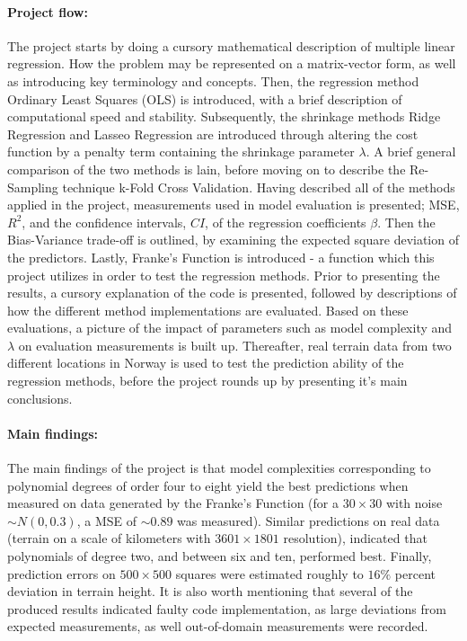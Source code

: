 \documentclass[%
oneside,                 %
final,                   %
10pt]{article}
\begin{document}
\paragraph{Project flow:}
The project starts by doing a cursory mathematical description of multiple linear regression. How the problem may be represented on a matrix-vector form, as well as introducing key terminology and concepts. Then, the regression method Ordinary Least Squares (OLS) is introduced, with a brief description of computational speed and stability. Subsequently, the shrinkage methods Ridge Regression and Lasseo Regression are introduced through altering the cost function by a penalty term containing the shrinkage parameter $\lambda$. A brief general comparison of the two methods is lain, before moving on to describe the Re-Sampling technique k-Fold Cross Validation. Having described all of the methods applied in the project, measurements used in model evaluation is presented; MSE, $R^2$, and the confidence intervals, $CI$, of the regression coefficients $\beta$. Then the Bias-Variance trade-off is outlined, by examining the expected square deviation of the predictors. Lastly, Franke's Function is introduced - a function which this project utilizes in order to test the regression methods. Prior to presenting the results, a cursory explanation of the code is presented, followed by descriptions of how the different method implementations are evaluated. Based on these evaluations, a picture of the impact of parameters such as model complexity and $\lambda$ on evaluation measurements is built up. Thereafter, real terrain data from two different locations in Norway is used to test the prediction ability of the regression methods, before the project rounds up by presenting it's main conclusions.
\paragraph{Main findings:}
The main findings of the project is that model complexities corresponding to polynomial degrees of order four to eight yield the best predictions when measured on data generated by the Franke's Function (for   a $30 \times 30$ with  noise $\sim N(0,0.3)$, a MSE of $\sim 0.89$ was measured). Similar predictions on real data (terrain on a scale of kilometers with $3601 \times 1801$ resolution), indicated that polynomials of degree two, and between six and ten, performed best. Finally, prediction errors on $500 \times 500$ squares were estimated roughly to $16\%$ percent deviation in terrain height. It is also worth mentioning that several of the produced results indicated faulty code implementation, as large deviations from expected measurements, as well out-of-domain measurements were recorded.
\end{document}
